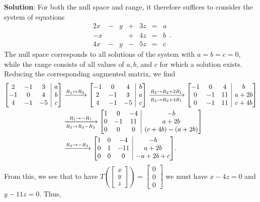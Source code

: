 \documentclass[12pt]{article}
\makeatletter
\newenvironment{amatrix}[1]{%
  \left[\begin{array}{@{}*{#1}{c}|c@{}}
}{%
  \end{array}\right]
}
\makeatother
\begin{document}
\begin{enumerate}
{\bf Solution}: For both the null space and range, it therefore suffices to consider the system of equations
\[
 \begin{array}{ccccccc}
  2x&-&y&+&3z&=&a\\
  -x& & &+&4z&=&b\\
  4x&-&y&-&5z&=&c
 \end{array}.
\]
The null space corresponds to all solutions of the system with $a=b=c=0$, while the range consists of all values of $a, b$, and $c$ for which a solution exists. Reducing the corresponding augmented matrix, we find
\begin{align*}
 \begin{amatrix}{3}
  2&-1&3&a\\-1&0&4&b\\4&-1&-5&c
 \end{amatrix} & \xrightarrow{R_1\leftrightarrow R_2} 
\begin{amatrix}{3}
-1&0&4&b\\2&-1&3&a\\4&-1&-5&c                                                       
\end{amatrix}\xrightarrow[R_3\to R_3+4R_1]{R_2\to R_2+2R_1}
\begin{amatrix}{3}
 -1&0&4&b\\
 0&-1&11&a+2b\\
 0&-1&11&c+4b
\end{amatrix}\\
&\xrightarrow[R_3\to R_3-R_2]{R_1\to -R_1}
\begin{amatrix}{3}
 1&0&-4&-b\\
 0&-1&11&a+2b\\
 0&0&0&(c+4b)-(a+2b)\\
\end{amatrix}\\
&\xrightarrow{R_2\to-R_2}
\begin{amatrix}{3}
 1&0&-4&-b\\
 0&1&-11&a+2b\\
 0&0&0&-a+2b+c
\end{amatrix}.
\end{align*}
From this, we see that to have $T\left(\begin{bmatrix}x\\y\\z\end{bmatrix}\right)=\begin{bmatrix}0\\0\\0\end{bmatrix}$ we must have $x-4z=0$ and $y-11z=0$. Thus,

\end{enumerate}
\end{document}
